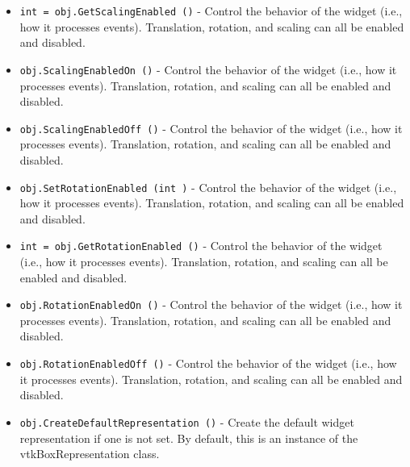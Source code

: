 \begin{itemize}
\item  \verb|int = obj.GetScalingEnabled ()| -  Control the behavior of the widget (i.e., how it processes
 events). Translation, rotation, and scaling can all be enabled and
 disabled.

\item  \verb|obj.ScalingEnabledOn ()| -  Control the behavior of the widget (i.e., how it processes
 events). Translation, rotation, and scaling can all be enabled and
 disabled.

\item  \verb|obj.ScalingEnabledOff ()| -  Control the behavior of the widget (i.e., how it processes
 events). Translation, rotation, and scaling can all be enabled and
 disabled.

\item  \verb|obj.SetRotationEnabled (int )| -  Control the behavior of the widget (i.e., how it processes
 events). Translation, rotation, and scaling can all be enabled and
 disabled.

\item  \verb|int = obj.GetRotationEnabled ()| -  Control the behavior of the widget (i.e., how it processes
 events). Translation, rotation, and scaling can all be enabled and
 disabled.

\item  \verb|obj.RotationEnabledOn ()| -  Control the behavior of the widget (i.e., how it processes
 events). Translation, rotation, and scaling can all be enabled and
 disabled.

\item  \verb|obj.RotationEnabledOff ()| -  Control the behavior of the widget (i.e., how it processes
 events). Translation, rotation, and scaling can all be enabled and
 disabled.

\item  \verb|obj.CreateDefaultRepresentation ()| -  Create the default widget representation if one is not set. By default,
 this is an instance of the vtkBoxRepresentation class.

\end{itemize}
